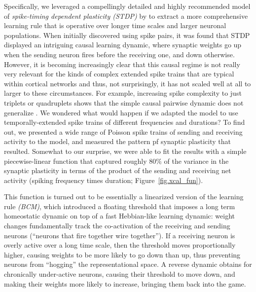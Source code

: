\documentclass[11pt,twoside]{article}
\begin{document}
Specifically, we leveraged a compellingly detailed and highly recommended model of
{\em spike-timing dependent plasticity (STDP)} by
 to extract a more comprehensive learning rule that is operative over longer time scales and larger neuronal populations. When initially discovered using spike pairs, it was found that STDP displayed an intriguing causal learning dynamic, where synaptic weights go up when the sending neuron fires before the receiving one, and down otherwise. However, it is becoming increasingly clear that this causal regime is not really very relevant for the kinds of complex extended spike trains that are typical within cortical networks
\cite{FroemkeDan02,RubinGerkinBiEtAl05,ShouvalWangWittenberg10,WangGerkinNauenEtAl05,stdpsucks} and thus, not surprisingly, it has not scaled well at all to larger to these circumstances.  For example, increasing spike complexity to just triplets or quadruplets shows that the simple causal pairwise dynamic does not generalize
\cite{FroemkeDan02,RubinGerkinBiEtAl05,WangGerkinNauenEtAl05}.  We wondered what would happen if we adapted the  model to use temporally-extended spike trains of different frequencies and durations? To find out, we presented a wide range of Poisson spike trains of sending and receiving activity to the model, and measured the pattern pf synaptic plasticity that resulted.  Somewhat to our surprise, we were able to fit the results with a simple piecewise-linear function that captured roughly 80\% of the variance
in the synaptic plasticity in terms of the product of the sending and receiving net activity (spiking frequency times duration; Figure~\ref{fig.xcal_fun}).

This function is turned out to be essentially a linearized version of the  learning rule {\em (BCM)}, which introduced a floating threshold that imposes a long term homeostatic dynamic on top of a fast Hebbian-like learning dynamic: weight changes fundamentally track the co-activation of the receiving and sending neurons (``neurons that fire together wire together'').  If a receiving neuron is overly active over a long time scale, then the threshold moves proportionally higher, causing weights to be more likely to go down than up, thus preventing neurons from ``hogging'' the representational space.  A reverse dynamic obtains for chronically under-active neurons, causing their threshold to move down, and making their weights more likely to increase, bringing them back into the game.
\end{document}
